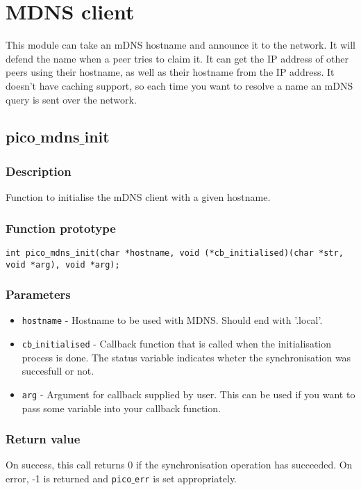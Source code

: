 \section{MDNS client}

This module can take an mDNS hostname and announce it to the network. It will defend the name when
a peer tries to claim it. It can get the IP address of other peers using their hostname, as well as their hostname from the IP address.
It doesn't have caching support, so each time you want to resolve a name an mDNS query is sent over the network. 

\subsection{pico$\_$mdns$\_$init}

\subsubsection*{Description}
Function to initialise the mDNS client with a given hostname.
\subsubsection*{Function prototype}
\begin{verbatim}
int pico_mdns_init(char *hostname, void (*cb_initialised)(char *str, void *arg), void *arg);
\end{verbatim}

\subsubsection*{Parameters}
\begin{itemize}[noitemsep]
\item \texttt{hostname} - Hostname to be used with MDNS. Should end with '.local'.
\item \texttt{cb$\_$initialised} - Callback function that is called when the initialisation process is done. The status variable indicates wheter the synchronisation was succesfull or not.
\item \texttt{arg} - Argument for callback supplied by user. This can be used if you want to pass some variable into your callback function.
\end{itemize}

\subsubsection*{Return value}
On success, this call returns 0 if the synchronisation operation has succeeded.
On error, -1 is returned and \texttt{pico$\_$err} is set appropriately.

